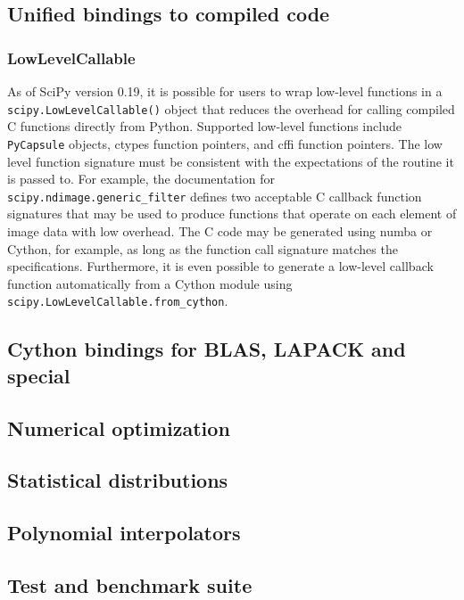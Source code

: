 \documentclass[fleqn,10pt]{wlscirep}
\begin{document}
\subsection*{Unified bindings to compiled code}
\subsubsection*{LowLevelCallable}
As of SciPy version 0.19, it is possible for users to wrap low-level
functions in a \texttt{scipy.LowLevelCallable()} object that reduces
the overhead for calling compiled C functions directly from Python.
Supported low-level functions include \texttt{PyCapsule} objects,
ctypes function pointers, and cffi function pointers. The low level
function signature must be consistent with the expectations of the
routine it is passed to. For example, the documentation for
\texttt{scipy.ndimage.generic\_filter} defines two acceptable C callback
function signatures that may be used to produce functions that operate
on each element of image data with low overhead. The C code may be
generated using numba or Cython, for example, as long as the function
call signature matches the specifications. Furthermore, it is even
possible to generate a low-level callback function automatically
from a Cython module using \texttt{scipy.LowLevelCallable.from\_cython}.

\subsection*{Cython bindings for BLAS, LAPACK and special}

\subsection*{Numerical optimization}



\subsection*{Statistical distributions}

\subsection*{Polynomial interpolators}

\subsection*{Test and benchmark suite}
\end{document}
